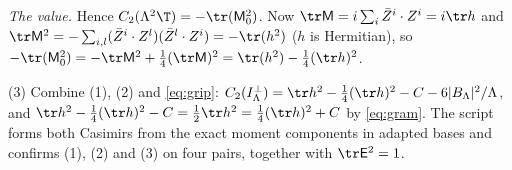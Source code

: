 \emph{The value.} Hence $C_{2}(\Lambda^{2}\T) = -\tr(\mathsf{M}_{0}^{2})$. Now $\tr\mathsf{M} = i\sum_{i}\bar{Z}^{i}\cdot Z^{i} = i\tr h$ and $\tr\mathsf{M}^{2} = -\sum_{i,l}(\bar{Z}^{i}\cdot Z^{l})(\bar{Z}^{l}\cdot Z^{i}) = -\tr(h^{2})$ ($h$ is Hermitian), so $-\tr(\mathsf{M}_{0}^{2}) = -\tr\mathsf{M}^{2} + \tfrac14(\tr\mathsf{M})^{2} = \tr(h^{2}) - \tfrac14(\tr h)^{2}$.

(3) Combine (1), (2) and \eqref{eq:grip}: $C_{2}(I_{\Lambda}^{\perp}) = \tr h^{2} - \tfrac14(\tr h)^{2} - C - 6|B_{\Lambda}|^{2}/\Lambda$, and $\tr h^{2} - \tfrac14(\tr h)^{2} - C = \tfrac12\tr h^{2} = \tfrac14(\tr h)^{2} + C$ by \eqref{eq:gram}. The script forms both Casimirs from the exact moment components in adapted bases and confirms (1), (2) and (3) on four pairs, together with $\tr\mathsf{E}^{2} = 1$.
